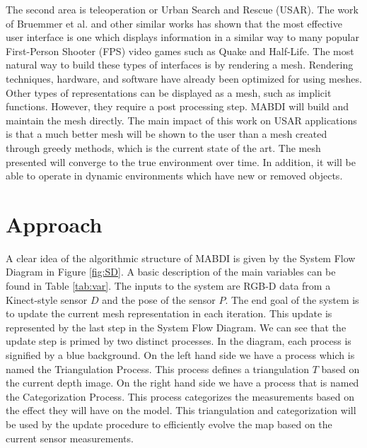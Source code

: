 \documentclass[12pt]{article}
\begin{document}
The second area is teleoperation or Urban Search and Rescue (USAR). The
work of Bruemmer et al. \cite{Bruemmer2005} and other similar works
\cite{Drury2003,Kadous2006} has shown that the most effective user
interface is one which displays information in a similar way to many
popular First-Person Shooter (FPS) video games such as Quake and Half-Life.
The most natural way to build these types of interfaces is by rendering a
mesh.  Rendering techniques, hardware, and software have already been
optimized for using meshes. Other types of representations can be displayed
as a mesh, such as implicit functions. However, they require a post processing
step.  MABDI will build and maintain the mesh directly. The main impact of
this work on USAR applications is that a much better mesh will be shown to
the user than a mesh created through greedy methods, which is the current
state of the art. The mesh presented will converge to the true environment over
time. In addition, it will be able to operate in dynamic environments which
have new or removed objects.   

\section{Approach}
\label{ch:approach}

A clear idea of the algorithmic structure of MABDI is
given by the System Flow Diagram in Figure \ref{fig:SD}. A basic
description of the main variables can be found in Table \ref{tab:var}.
The inputs to the system are RGB-D data from a Kinect-style sensor $D$
and the pose of the sensor $P$. The end goal of the system is to update
the current mesh representation in each iteration. This update is
represented by the last step in the System Flow Diagram. We can see that
the update step is primed by two distinct processes. In the diagram,
each process is signified  by a blue background. On the left hand side
we have a process which is named the Triangulation Process. This
process defines a triangulation $T$ based on the current depth image. On
the right hand side we have a process that is named the
Categorization Process. This process categorizes the measurements based
on the effect they will have on the model. This triangulation
and categorization will be used by the update procedure to efficiently
evolve the map based on the current sensor measurements.                                                                 
\end{document}
